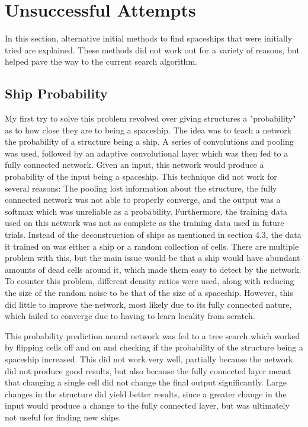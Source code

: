 \documentclass{l4proj}
\begin{document}
\section {Unsuccessful Attempts}

In this section, alternative initial methods to find spaceships that were initially tried are explained. These methods did not work out for a variety of reasons, but helped pave the way to the current search algorithm. 

\subsection{Ship Probability}

My first try to solve this problem revolved over giving structures a "probability" as to how close they are to being a spaceship. The idea was to teach a network the probability of a structure being a ship. A series of convolutions and pooling was used, followed by an adaptive convolutional layer which was then fed to a fully connected network. Given an input, this network would produce a probability of the input being a spaceship. This technique did not work for several reasons: The pooling lost information about the structure, the fully connected network was not able to properly converge, and the output was a softmax which was unreliable as a probability. Furthermore, the training data used on this network was not as complete as the training data used in future trials. Instead of the deconstruction of ships as mentioned in section 4.3, the data it trained on was either a ship or a random collection of cells. There are multiple problem with this, but the main issue would be that a ship would have abundant amounts of dead cells around it, which made them easy to detect by the network. To counter this problem, different density ratios were used, along with reducing the size of the random noise to be that of the size of a spaceship. However, this did little to improve the network, most likely due to its fully connected nature, which failed to converge due to having to learn locality from scratch.

This probability prediction neural network was fed to a tree search which worked by flipping cells off and on and checking if the probability of the structure being a spaceship increased. This did not work very well, partially because the network did not produce good results, but also because the fully connected layer meant that changing a single cell did not change the final output significantly. Large changes in the structure did yield better results, since a greater change in the input would produce a change to the fully connected layer, but was ultimately not useful for finding new ships. 
\end{document}
